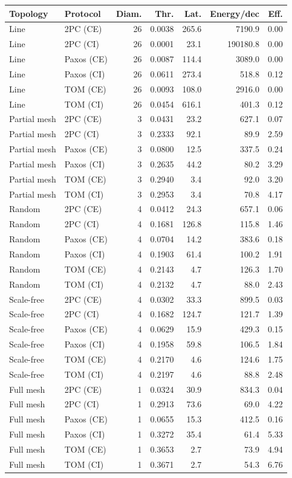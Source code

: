 \begin{tabular}{llrrrrr}
\hline
Topology & Protocol & Diam. & Thr. & Lat. & Energy/dec & Eff. \\
\hline
Line & 2PC (CE) & 26 & 0.0038 & 265.6 & 7190.9 & 0.00 \\
Line & 2PC (CI) & 26 & 0.0001 & 23.1 & 190180.8 & 0.00 \\
Line & Paxos (CE) & 26 & 0.0087 & 114.4 & 3089.0 & 0.00 \\
Line & Paxos (CI) & 26 & 0.0611 & 273.4 & 518.8 & 0.12 \\
Line & TOM (CE) & 26 & 0.0093 & 108.0 & 2916.0 & 0.00 \\
Line & TOM (CI) & 26 & 0.0454 & 616.1 & 401.3 & 0.12 \\
Partial mesh & 2PC (CE) & 3 & 0.0431 & 23.2 & 627.1 & 0.07 \\
Partial mesh & 2PC (CI) & 3 & 0.2333 & 92.1 & 89.9 & 2.59 \\
Partial mesh & Paxos (CE) & 3 & 0.0800 & 12.5 & 337.5 & 0.24 \\
Partial mesh & Paxos (CI) & 3 & 0.2635 & 44.2 & 80.2 & 3.29 \\
Partial mesh & TOM (CE) & 3 & 0.2940 & 3.4 & 92.0 & 3.20 \\
Partial mesh & TOM (CI) & 3 & 0.2953 & 3.4 & 70.8 & 4.17 \\
Random & 2PC (CE) & 4 & 0.0412 & 24.3 & 657.1 & 0.06 \\
Random & 2PC (CI) & 4 & 0.1681 & 126.8 & 115.8 & 1.46 \\
Random & Paxos (CE) & 4 & 0.0704 & 14.2 & 383.6 & 0.18 \\
Random & Paxos (CI) & 4 & 0.1903 & 61.4 & 100.2 & 1.91 \\
Random & TOM (CE) & 4 & 0.2143 & 4.7 & 126.3 & 1.70 \\
Random & TOM (CI) & 4 & 0.2132 & 4.7 & 88.0 & 2.43 \\
Scale-free & 2PC (CE) & 4 & 0.0302 & 33.3 & 899.5 & 0.03 \\
Scale-free & 2PC (CI) & 4 & 0.1682 & 124.7 & 121.7 & 1.39 \\
Scale-free & Paxos (CE) & 4 & 0.0629 & 15.9 & 429.3 & 0.15 \\
Scale-free & Paxos (CI) & 4 & 0.1958 & 59.8 & 106.5 & 1.84 \\
Scale-free & TOM (CE) & 4 & 0.2170 & 4.6 & 124.6 & 1.75 \\
Scale-free & TOM (CI) & 4 & 0.2197 & 4.6 & 88.8 & 2.48 \\
Full mesh & 2PC (CE) & 1 & 0.0324 & 30.9 & 834.3 & 0.04 \\
Full mesh & 2PC (CI) & 1 & 0.2913 & 73.6 & 69.0 & 4.22 \\
Full mesh & Paxos (CE) & 1 & 0.0655 & 15.3 & 412.5 & 0.16 \\
Full mesh & Paxos (CI) & 1 & 0.3272 & 35.4 & 61.4 & 5.33 \\
Full mesh & TOM (CE) & 1 & 0.3653 & 2.7 & 73.9 & 4.94 \\
Full mesh & TOM (CI) & 1 & 0.3671 & 2.7 & 54.3 & 6.76 \\
\hline
\end{tabular}

